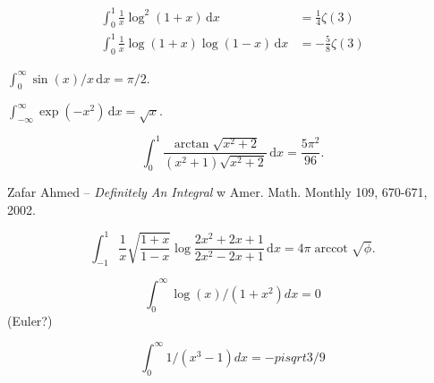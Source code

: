 \begin{problem}
    \begin{align}
        \int_0^1 \frac{1}{x} \log^2 (1+x) \,\mathrm{d}x & = \frac{1}{4} \zeta(3) \\
        \int_0^1 \frac{1}{x} \log (1+x) \log (1-x) \,\mathrm{d}x & = -\frac{5}{8} \zeta(3)
    \end{align}
\end{problem}





\begin{problem}
    $\int_0^\infty \sin(x) / x \,\mathrm{d}x = \pi/2$.
\end{problem}

\begin{problem}
    $\int_{-\infty}^\infty \exp(-x^2) \,\mathrm{d}x = \sqrt x$.
\end{problem}

\begin{problem}
    \begin{equation}
        \int_0^1 \frac{\arctan \sqrt{x^2+2}}{(x^2+1) \sqrt{x^2+2}} \,\mathrm{d}x = \frac{5\pi^2}{96}.
    \end{equation}
\end{problem}

\begin{solution}
    Zafar Ahmed -- \emph{Definitely An Integral} w Amer. Math. Monthly 109, 670-671, 2002.
\end{solution}

\begin{problem}
    \begin{equation}
        \int_{-1}^1 \frac{1}{x} \sqrt{\frac{1+x}{1-x}} \log \frac{2x^2+2x+1}{2x^2-2x+1} \,\mathrm{d}x = 4 \pi \operatorname{arccot} \sqrt{\phi}.
    \end{equation}
\end{problem}

$$\int_0^\infty \log(x) / (1+x^2) dx = 0$$ (Euler?)

$$\int_0^\infty 1/(x^3 - 1) dx = -pi sqrt 3 / 9$$

